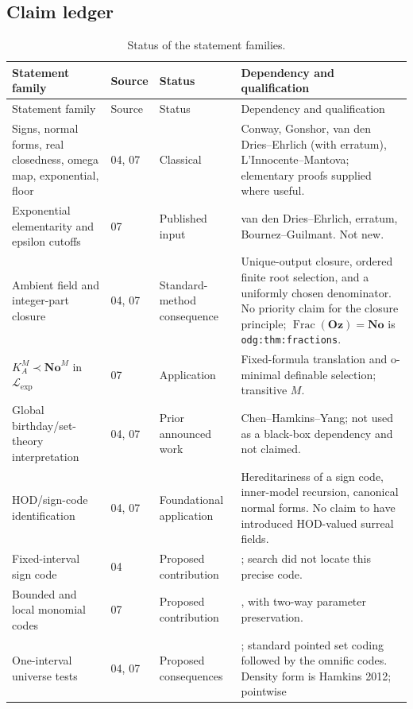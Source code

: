 \documentclass[11pt,a4paper]{article}
\numberwithin{equation}{section}
\theoremstyle{definition}
\theoremstyle{remark}
\newcommand{\No}{\mathbf{No}}
\newcommand{\Oz}{\mathbf{Oz}}
\newcommand{\HOD}{\mathrm{HOD}}
\newcommand{\Frac}{\operatorname{Frac}}
\newcommand{\Lexp}{\mathcal L_{\exp}}
\newcommand{\lbl}[1]{\nolinkurl{#1}}
\begin{document}
\subsection{Claim ledger}

\begin{longtable}{@{}P{0.27\textwidth}P{0.10\textwidth}P{0.23\textwidth}P{0.32\textwidth}@{}}
\caption{Status of the statement families.}\label{dsn:tab:ledger}\\
\toprule
Statement family & Source & Status & Dependency and qualification\\
\midrule
\endfirsthead
\toprule
Statement family & Source & Status & Dependency and qualification\\
\midrule
\endhead
Signs, normal forms, real closedness, omega map, exponential, floor &
04, 07 & Classical & Conway, Gonshor, van den Dries--Ehrlich (with
erratum), L'Innocente--Mantova; elementary proofs supplied where useful.\\
Exponential elementarity and epsilon cutoffs & 07 & Published input &
van den Dries--Ehrlich, erratum, Bournez--Guilmant. Not new.\\
Ambient field and integer-part closure & 04, 07 & Standard-method
consequence & Unique-output closure, ordered finite root selection, and a
uniformly chosen denominator. No priority claim for the closure
principle; $\Frac(\Oz)=\No$ is \lbl{odg:thm:fractions}.\\
$K^M_A\prec\No^M$ in $\Lexp$ & 07 & Application & Fixed-formula translation
and o-minimal definable selection; transitive $M$.\\
Global birthday/set-theory interpretation & 04, 07 & Prior announced work
& Chen--Hamkins--Yang; not used as a black-box dependency and not
claimed.\\
HOD/sign-code identification & 04, 07 & Foundational application &
Hereditariness of a sign code, inner-model recursion, canonical normal
forms. No claim to have introduced $\HOD$-valued surreal fields.\\
Fixed-interval sign code & 04 & Proposed contribution &
; search did not locate this precise code.\\
Bounded and local monomial codes & 07 & Proposed contribution &
, with two-way parameter
preservation.\\
One-interval universe tests & 04, 07 & Proposed consequences &
; standard pointed set coding
followed by the omnific codes. Density form is Hamkins 2012; pointwise

\end{longtable}
\end{document}
